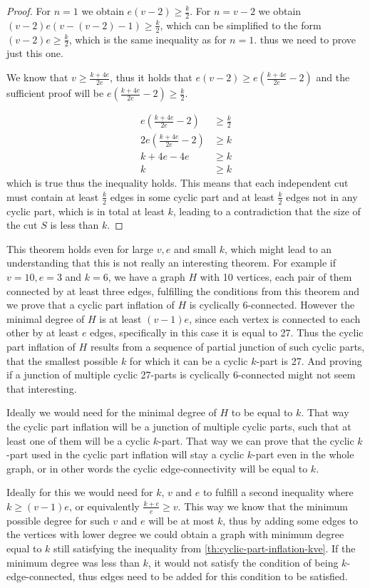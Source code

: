\documentclass[12pt, twoside]{book}
\begin{document}
\begin{proof}
	For $n=1$ we obtain $e(v-2)\geq \frac{k}{2}$. For $n=v-2$ we obtain $(v-2)e(v-(v-2)-1)\geq\frac{k}{2}$, which can be simplified to the form $(v-2)e\geq\frac{k}{2}$, which is the same inequality as for $n=1$. thus we need to prove just this one.
	
	We know that $v\geq \frac{k+4e}{2e}$, thus it holds that $e(v-2)\geq e(\frac{k+4e}{2e}-2)$ and the sufficient proof will be $e(\frac{k+4e}{2e}-2)\geq \frac{k}{2}$.
	
	\begin{align*}
		e\left(\frac{k+4e}{2e}-2\right)&\geq \frac{k}{2} \\
		2e\left(\frac{k+4e}{2e}-2\right)&\geq k \\
		k+4e-4e&\geq k \\
		k&\geq k
	\end{align*}
	which is true thus the inequality holds. This means that each independent cut must contain at least $\frac{k}{2}$ edges in some cyclic part and at least $\frac{k}{2}$ edges not in any cyclic part, which is in total at least $k$, leading to a contradiction that the size of the cut $S$ is less than $k$.
\end{proof}

This theorem holds even for large $v,e$ and small $k$, which might lead to an understanding that this is not really an interesting theorem. For example if $v=10,e=3$ and $k=6$, we have a graph $H$ with 10 vertices, each pair of them connected by at least three edges, fulfilling the conditions from this theorem and we prove that a cyclic part inflation of $H$ is cyclically 6-connected. However the minimal degree of $H$ is at least $(v-1)e$, since each vertex is connected to each other by at least $e$ edges, specifically in this case it is equal to 27. Thus the cyclic part inflation of $H$ results from a sequence of partial junction of such cyclic parts, that the smallest possible $k$ for which it can be a cyclic $k$-part is 27. And proving if a junction of multiple cyclic 27-parts is cyclically 6-connected might not seem that interesting.

Ideally we would need for the minimal degree of $H$ to be equal to $k$. That way the cyclic part inflation will be a junction of multiple cyclic parts, such that at least one of them will be a cyclic $k$-part. That way we can prove that the cyclic $k$-part used in the cyclic part inflation will stay a cyclic $k$-part even in the whole graph, or in other words the cyclic edge-connectivity will be equal to $k$.

Ideally for this we would need for $k$, $v$ and $e$ to fulfill a second inequality where ${k\geq (v-1)e}$, or equivalently $\frac{k+e}{e}\geq v$. This way we know that the minimum possible degree for such $v$ and $e$ will be at most $k$, thus by adding some edges to the vertices with lower degree we could obtain a graph with minimum degree equal to $k$ still satisfying the inequality from \cref{th:cyclic-part-inflation-kve}. If the minimum degree was less than $k$, it would not satisfy the condition of being $k$-edge-connected, thus edges need to be added for this condition to be satisfied.
\end{document}
